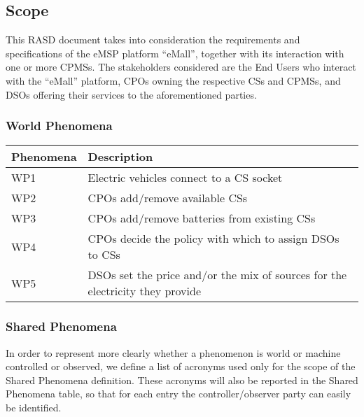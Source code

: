 \documentclass[12pt]{article}
\begin{document}
\subsection{Scope}

This RASD document takes into consideration the requirements and specifications of the eMSP platform “eMall”, together with its interaction with one or more CPMSs. The stakeholders considered are the End Users who interact with the “eMall” platform, CPOs owning the respective CSs and CPMSs, and DSOs offering their services to the aforementioned parties.

\subsubsection{World Phenomena}

\begin{table}[H]
    \centering
    \setlength{\tabcolsep}{18pt}
    \renewcommand{\arraystretch}{1.2}
    \begin{tabularx}{\textwidth}{|>{\centering\hsize=0.3\hsize}X|>{\hsize=1.7\hsize}X|}
        \hline
        \textbf{Phenomena} & \textbf{Description} \\
        \hline
        WP1 & Electric vehicles connect to a CS socket \\
        \hline
        WP2 & CPOs add/remove available CSs \\
        \hline
        WP3 & CPOs add/remove batteries from existing CSs \\
        \hline
        WP4 & CPOs decide the policy with which to assign DSOs to CSs \\
        \hline
        WP5 & DSOs set the price and/or the mix of sources for the electricity they provide \\
        \hline
    \end{tabularx}
    \label{tab:world_phenomena}
\end{table}

\subsubsection{Shared Phenomena}

In order to represent more clearly whether a phenomenon is world or machine controlled or observed, we define a list of acronyms used only for the scope of the Shared Phenomena definition. These acronyms will also be reported in the Shared Phenomena table, so that for each entry the controller/observer party can easily be identified. 
\end{document}

